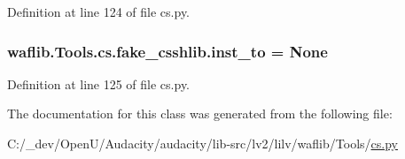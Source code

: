 Definition at line 124 of file cs.\+py.

\subsubsection[{\texorpdfstring{inst\+\_\+to}{inst_to}}]{\setlength{\rightskip}{0pt plus 5cm}waflib.\+Tools.\+cs.\+fake\+\_\+csshlib.\+inst\+\_\+to = None\hspace{0.3cm}{\ttfamily [static]}}\hypertarget{classwaflib_1_1_tools_1_1cs_1_1fake__csshlib_a3326fadb18c88deebd2ec0deee3d8b17}{}\label{classwaflib_1_1_tools_1_1cs_1_1fake__csshlib_a3326fadb18c88deebd2ec0deee3d8b17}


Definition at line 125 of file cs.\+py.



The documentation for this class was generated from the following file\+:\begin{DoxyCompactItemize}
\item 
C\+:/\+\_\+dev/\+Open\+U/\+Audacity/audacity/lib-\/src/lv2/lilv/waflib/\+Tools/\hyperlink{lilv_2waflib_2_tools_2cs_8py}{cs.\+py}\end{DoxyCompactItemize}
